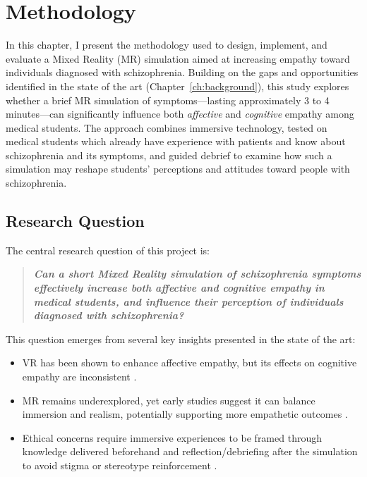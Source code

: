 \chapter{Methodology}
\label{ch:method}

In this chapter, I present the methodology used to design, implement, and evaluate a Mixed Reality (MR) simulation aimed at increasing empathy toward individuals diagnosed with schizophrenia. Building on the gaps and opportunities identified in the state of the art (Chapter~\ref{ch:background}), this study explores whether a brief MR simulation of symptoms—lasting approximately 3 to 4 minutes—can significantly influence both \textit{affective} and \textit{cognitive} empathy among medical students. The approach combines immersive technology, tested on medical students which already have experience with patients and know about schizophrenia and its symptoms, and guided debrief to examine how such a simulation may reshape students' perceptions and attitudes toward people with schizophrenia.

\section{Research Question}

The central research question of this project is:

\begin{quote}
\textit{\textbf{Can a short Mixed Reality simulation of schizophrenia symptoms effectively increase both affective and cognitive empathy in medical students, and influence their perception of individuals diagnosed with schizophrenia?}}
\end{quote}

This question emerges from several key insights presented in the state of the art:

\begin{itemize}
    \item VR has been shown to enhance affective empathy, but its effects on cognitive empathy are inconsistent \cite{Martingano2021, Ventura2020}.
    \item MR remains underexplored, yet early studies suggest it can balance immersion and realism, potentially supporting more empathetic outcomes \cite{Silva2017, Krogmeier2024}.
    \item Ethical concerns require immersive experiences to be framed through knowledge delivered beforehand and reflection/debriefing after the simulation to avoid stigma or stereotype reinforcement \cite{Rueda2020, Ando2011}.
\end{itemize}

